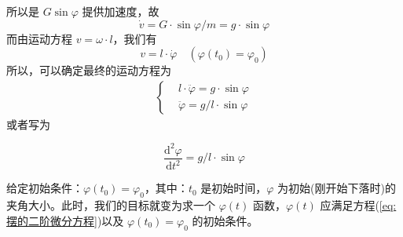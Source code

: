 		所以是 $G\sin{\varphi}$ 提供加速度，故
		\[
			\dot{v} = G \cdot \sin{\varphi} / m = g \cdot \sin{\varphi}
		\]
		而由运动方程 $v = \omega \cdot l$，我们有
		\[
			v = l \cdot \dot{\varphi} \quad (\varphi(t_0) = \varphi_0)
		\]
		所以，可以确定最终的运动方程为
		\begin{align*}
			\left\{
				\begin{aligned}
				&l \cdot \ddot{\varphi} = g \cdot \sin{\varphi}\\
				&\ddot{\varphi} = g/l \cdot \sin{\varphi}
				\end{aligned}
			\right.
		\end{align*}
		或者写为
		\par
		\begin{equation}
			\frac{\mathrm{d}^2\varphi}{\mathrm{d}t^2} = g/l \cdot \sin{\varphi}
			\label{eq:摆的二阶微分方程}
		\end{equation}
		\par
		给定初始条件：$\varphi(t_0) = \varphi_0$，其中：$t_0$ 是初始时间，$\varphi$ 为初始(刚开始下落时)的夹角大小。此时，我们的目标就变为求一个 $\varphi(t)$ 函数，$\varphi(t)$ 应满足方程(\ref{eq:摆的二阶微分方程})以及 $\varphi(t_0) = \varphi_0$ 的初始条件。
